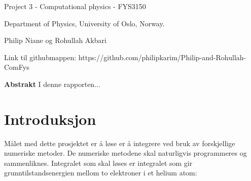 \documentclass[%
oneside,                 %
final,                   %
10pt]{article}
\begin{document}

\newcommand{\exercisesection}[1]{\subsection*{#1}}






\thispagestyle{empty}

\begin{center}
{\LARGE\bf
\begin{spacing}{1.25}
Project 3 - Computational physics - FYS3150
\end{spacing}
}
\end{center}



    \begin{center}
\centerline{{\small Department of Physics, University of Oslo, Norway.}}
\centerline{Philip Niane og Rohullah Akbari}

Link til githubmappen: https://github.com/philipkarim/Philip-and-Rohullah-ComFys
\end{center}




\vspace{1cm}

\noindent\textbf{\Large{Abstrakt}}\newline
I denne rapporten...

\tableofcontents
\section{Introduksjon}
Målet med dette prosjektet er å løse er å integrere ved bruk av forskjellige numeriske metoder. De numeriske metodene skal naturligvis programmeres og sammenliknes. Integralet som skal løses er integralet som gir grunntilstandsenergien mellom to elektroner i et helium atom:
\end{document}
